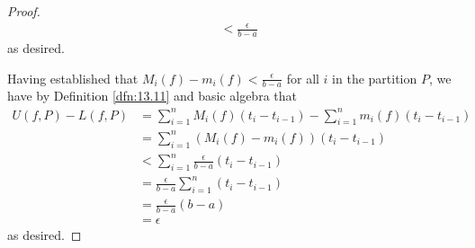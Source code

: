 \documentclass[../main.tex]{subfiles}
\begin{document}
\begin{theorem}
\begin{proof}
\begin{align*}
            &< \frac{\epsilon}{b-a}
        \end{align*}
        as desired.\par
        Having established that $M_i(f)-m_i(f)<\frac{\epsilon}{b-a}$ for all $i$ in the partition $P$, we have by Definition \ref{dfn:13.11} and basic algebra that
        \begin{align*}
            U(f,P)-L(f,P) &= \sum_{i=1}^nM_i(f)(t_i-t_{i-1})-\sum_{i=1}^nm_i(f)(t_i-t_{i-1})\\
            &= \sum_{i=1}^n(M_i(f)-m_i(f))(t_i-t_{i-1})\\
            &< \sum_{i=1}^n\frac{\epsilon}{b-a}(t_i-t_{i-1})\\
            &= \frac{\epsilon}{b-a}\sum_{i=1}^n(t_i-t_{i-1})\\
            &= \frac{\epsilon}{b-a}(b-a)\\
            &= \epsilon
        \end{align*}
        as desired.
    \end{proof}
\end{theorem}
\end{document}

